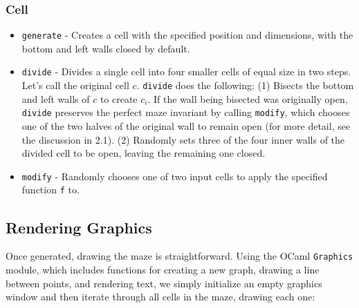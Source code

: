 \documentclass[11pt, margin=1in]{article}
\begin{document}
\subsubsection{Cell}
\begin{itemize}
\item \texttt{generate} - Creates a cell with the specified position and dimensions, with the bottom and left walls closed by default. 
\item \texttt{divide} - Divides a single cell into four smaller cells of equal size in two steps. Let's call the original cell $c$. \texttt{divide} does the following: (1) Bisects the bottom and left walls of $c$ to create $c_i$. If the wall being bisected was originally open, \texttt{divide} preserves the perfect maze invariant by calling \texttt{modify}, which chooses one of the two halves of the original wall to remain open (for more detail, see the discussion in 2.1). (2) Randomly sets three of the four inner walls of the divided cell to be open, leaving the remaining one closed.  
\item \texttt{modify} - Randomly chooses one of two input cells to apply the specified function \texttt{f} to. 
\end{itemize}

\subsection{Rendering Graphics} %
Once generated, drawing the maze is straightforward. Using the OCaml \texttt{Graphics} module, which includes functions for creating a new graph, drawing a line between points, and rendering text, we simply initialize an empty graphics window and then iterate through all cells in the maze, drawing each one:
\end{document}
